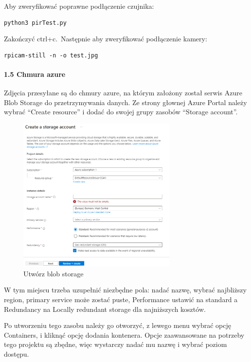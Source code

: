 \documentclass{article}
\begin{document}
Aby zweryfikować poprawne podłączenie czujnika:

\begin{verbatim}
python3 pirTest.py
\end{verbatim}

Zakończyć ctrl+c.~Następnie aby zweryfikować podłączenie kamery:

\begin{verbatim}
rpicam-still -n -o test.jpg
\end{verbatim}

\paragraph{1.5 Chmura azure}\label{chmura-azure}

Zdjęcia przesyłane są do chmury azure, na którym założony został serwis
Azure Blob Storage do przetrzymywania danych. Ze strony głownej Azure
Portal należy wybrać ``Create resource'' i dodać do swojej grupy zasobów
``Storage account''.

\begin{figure}[H]
\centering
\includegraphics[width=3.125in,height=\textheight,keepaspectratio]{images/create-blob-storage.png}
\caption{Utwórz blob storage}
\end{figure}

W tym miejscu trzeba uzupełnić niezbędne pola: nadać nazwę, wybrać
najbliższy region, primary service może zostać puste, Performance
ustawić na standard a Redundancy na Locally redundant storage dla
najniższych kosztów.

Po utworzeniu tego zasobu należy go otworzyć, z lewego menu wybrać opcję
Containers, i kliknąć opcję dodania kontenera. Opcje zaawansowane na
potrzeby tego projektu są zbędne, więc wystarczy nadać mu nazwę i wybrać
poziom dostępu.
\end{document}
